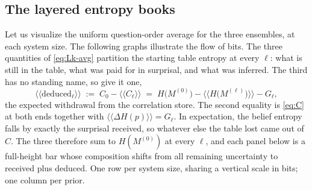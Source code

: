 \documentclass[11pt]{article}
\begin{document}
\subsection{The layered entropy books}\label{sec:gibbsbooks}

Let us visualize the uniform question-order average for the three ensembles,
at each system size. The following graphs illustrate the flow of bits. 
The three quantities of \eqref{eq:Lk-avg} partition
the starting table entropy at every $\ell$: what is still in the table,
what was paid for in surprisal, and what was inferred. The third has no
standing name, so give it one,
%
\begin{equation}
  \big\langle\!\big\langle \text{deduced}_\ell \big\rangle\!\big\rangle
  \;:=\; C_0 - \langle\!\langle C_\ell\rangle\!\rangle
  \;=\; H\big(M^{(0)}\big)
        - \big\langle\!\big\langle H\big(M^{(\ell)}\big)\big\rangle\!\big\rangle
        - G_\ell ,
  \label{eq:deduced}
\end{equation}
%
the expected withdrawal from the correlation store. The second equality
is \eqref{eq:C} at both ends together with $\langle\!\langle \Delta H(p)\rangle\!\rangle =
G_\ell$. In expectation, the belief entropy falls by exactly the
surprisal received, so whatever else the table lost came out of $C$.
The three therefore sum to $H(M^{(0)})$ at every $\ell$, and each
panel below is a full-height bar whose composition shifts from all
remaining uncertainty to received plus deduced. One row per system size, sharing a
vertical scale in bits; one column per prior.
\begin{center}
\end{center}
\end{document}
